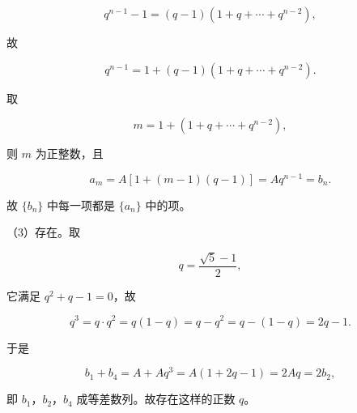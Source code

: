 \begin{answer}
\nopagebreak[4]
\[q^{n-1}-1=(q-1)(1+q+\cdots+q^{n-2}),\]

故

\nopagebreak[4]
\[q^{n-1}=1+(q-1)(1+q+\cdots+q^{n-2}).\]

取

\nopagebreak[4]
\[m=1+(1+q+\cdots+q^{n-2}),\]

则 $m$ 为正整数，且

\nopagebreak[4]
\[a_m=A[1+(m-1)(q-1)]=Aq^{n-1}=b_n.\]

故 $\{b_n\}$ 中每一项都是 $\{a_n\}$ 中的项。

（3）存在。取

\nopagebreak[4]
\[q=\frac{\sqrt5-1}{2},\]

它满足 $q^2+q-1=0$，故

\nopagebreak[4]
\[q^3=q\cdot q^2=q(1-q)=q-q^2=q-(1-q)=2q-1.\]

于是

\nopagebreak[4]
\[b_1+b_4=A+Aq^3=A(1+2q-1)=2Aq=2b_2,\]

即 $b_1$，$b_2$，$b_4$ 成等差数列。故存在这样的正数 $q$。


\end{answer}
